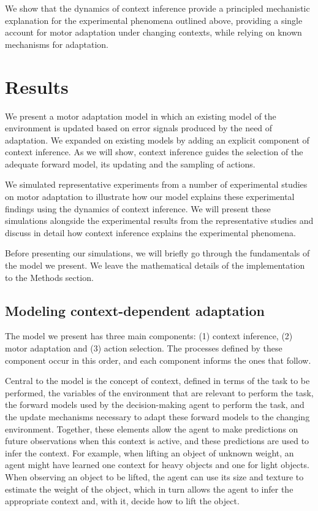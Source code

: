\documentclass[a4paper,doc,floatsintext,natbib]{apa6}%
\begin{document}
We show that the dynamics of context inference provide a principled mechanistic explanation for the experimental phenomena outlined above, providing a single account for motor adaptation under changing contexts, while relying on known mechanisms for adaptation.

\section{Results}
We present a motor adaptation model in which an existing model of the environment is updated based on error signals produced by the need of adaptation. We expanded on existing models \citep{Wolpert_Multiple_1998,Kording_Bayesian_2004,Oh_Minimizing_2019} by adding an explicit component of context inference. As we will show, context inference guides the selection of the adequate forward model, its updating and the sampling of actions.

We simulated representative experiments from a number of experimental studies on motor adaptation to illustrate how our model explains these experimental findings using the dynamics of context inference. We will present these simulations alongside the experimental results from the representative studies and discuss in detail how context inference explains the experimental phenomena.

Before presenting our simulations, we will briefly go through the fundamentals of the model we present. We leave the mathematical details of the implementation to the Methods section.

\subsection{Modeling context-dependent adaptation}
The model we present has three main components: (1) context inference, (2) motor adaptation and (3) action selection. The processes defined by these component occur in this order, and each component informs the ones that follow.

Central to the model is the concept of context, defined in terms of the task to be performed, the variables of the environment that are relevant to perform the task, the forward models used by the decision-making agent to perform the task, and the update mechanisms necessary to adapt these forward models to the changing environment. Together, these elements allow the agent to make predictions on future observations when this context is active, and these predictions are used to infer the context. For example, when lifting an object of unknown weight, an agent might have learned one context for heavy objects and one for light objects. When observing an object to be lifted, the agent can use its size and texture to estimate the weight of the object, which in turn allows the agent to infer the appropriate context and, with it, decide how to lift the object.
\end{document}
